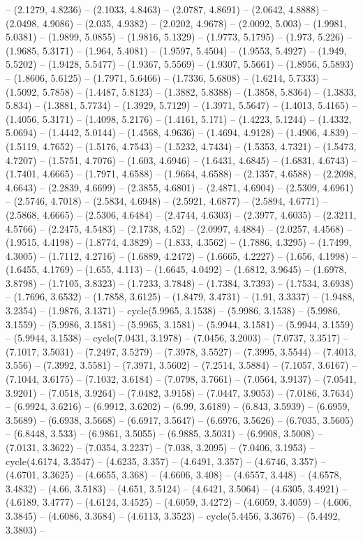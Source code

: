 -- (2.1279, 4.8236) -- (2.1033, 4.8463) -- (2.0787, 4.8691) -- (2.0642, 4.8888) -- (2.0498, 4.9086) -- (2.035, 4.9382) -- (2.0202, 4.9678) -- (2.0092, 5.003) -- (1.9981, 5.0381) -- (1.9899, 5.0855) -- (1.9816, 5.1329) -- (1.9773, 5.1795) -- (1.973, 5.226) -- (1.9685, 5.3171) -- (1.964, 5.4081) -- (1.9597, 5.4504) -- (1.9553, 5.4927) -- (1.949, 5.5202) -- (1.9428, 5.5477) -- (1.9367, 5.5569) -- (1.9307, 5.5661) -- (1.8956, 5.5893) -- (1.8606, 5.6125) -- (1.7971, 5.6466) -- (1.7336, 5.6808) -- (1.6214, 5.7333) -- (1.5092, 5.7858) -- (1.4487, 5.8123) -- (1.3882, 5.8388) -- (1.3858, 5.8364) -- (1.3833, 5.834) -- (1.3881, 5.7734) -- (1.3929, 5.7129) -- (1.3971, 5.5647) -- (1.4013, 5.4165) -- (1.4056, 5.3171) -- (1.4098, 5.2176) -- (1.4161, 5.171) -- (1.4223, 5.1244) -- (1.4332, 5.0694) -- (1.4442, 5.0144) -- (1.4568, 4.9636) -- (1.4694, 4.9128) -- (1.4906, 4.839) -- (1.5119, 4.7652) -- (1.5176, 4.7543) -- (1.5232, 4.7434) -- (1.5353, 4.7321) -- (1.5473, 4.7207) -- (1.5751, 4.7076) -- (1.603, 4.6946) -- (1.6431, 4.6845) -- (1.6831, 4.6743) -- (1.7401, 4.6665) -- (1.7971, 4.6588) -- (1.9664, 4.6588) -- (2.1357, 4.6588) -- (2.2098, 4.6643) -- (2.2839, 4.6699) -- (2.3855, 4.6801) -- (2.4871, 4.6904) -- (2.5309, 4.6961) -- (2.5746, 4.7018) -- (2.5834, 4.6948) -- (2.5921, 4.6877) -- (2.5894, 4.6771) -- (2.5868, 4.6665) -- (2.5306, 4.6484) -- (2.4744, 4.6303) -- (2.3977, 4.6035) -- (2.3211, 4.5766) -- (2.2475, 4.5483) -- (2.1738, 4.52) -- (2.0997, 4.4884) -- (2.0257, 4.4568) -- (1.9515, 4.4198) -- (1.8774, 4.3829) -- (1.833, 4.3562) -- (1.7886, 4.3295) -- (1.7499, 4.3005) -- (1.7112, 4.2716) -- (1.6889, 4.2472) -- (1.6665, 4.2227) -- (1.656, 4.1998) -- (1.6455, 4.1769) -- (1.655, 4.113) -- (1.6645, 4.0492) -- (1.6812, 3.9645) -- (1.6978, 3.8798) -- (1.7105, 3.8323) -- (1.7233, 3.7848) -- (1.7384, 3.7393) -- (1.7534, 3.6938) -- (1.7696, 3.6532) -- (1.7858, 3.6125) -- (1.8479, 3.4731) -- (1.91, 3.3337) -- (1.9488, 3.2354) -- (1.9876, 3.1371) -- cycle(5.9965, 3.1538) -- (5.9986, 3.1538) -- (5.9986, 3.1559) -- (5.9986, 3.1581) -- (5.9965, 3.1581) -- (5.9944, 3.1581) -- (5.9944, 3.1559) -- (5.9944, 3.1538) -- cycle(7.0431, 3.1978) -- (7.0456, 3.2003) -- (7.0737, 3.3517) -- (7.1017, 3.5031) -- (7.2497, 3.5279) -- (7.3978, 3.5527) -- (7.3995, 3.5544) -- (7.4013, 3.556) -- (7.3992, 3.5581) -- (7.3971, 3.5602) -- (7.2514, 3.5884) -- (7.1057, 3.6167) -- (7.1044, 3.6175) -- (7.1032, 3.6184) -- (7.0798, 3.7661) -- (7.0564, 3.9137) -- (7.0541, 3.9201) -- (7.0518, 3.9264) -- (7.0482, 3.9158) -- (7.0447, 3.9053) -- (7.0186, 3.7634) -- (6.9924, 3.6216) -- (6.9912, 3.6202) -- (6.99, 3.6189) -- (6.843, 3.5939) -- (6.6959, 3.5689) -- (6.6938, 3.5668) -- (6.6917, 3.5647) -- (6.6976, 3.5626) -- (6.7035, 3.5605) -- (6.8448, 3.533) -- (6.9861, 3.5055) -- (6.9885, 3.5031) -- (6.9908, 3.5008) -- (7.0131, 3.3622) -- (7.0354, 3.2237) -- (7.038, 3.2095) -- (7.0406, 3.1953) -- cycle(4.6174, 3.3547) -- (4.6235, 3.357) -- (4.6491, 3.357) -- (4.6746, 3.357) -- (4.6701, 3.3625) -- (4.6655, 3.368) -- (4.6606, 3.408) -- (4.6557, 3.448) -- (4.6578, 3.4832) -- (4.66, 3.5183) -- (4.651, 3.5124) -- (4.6421, 3.5064) -- (4.6305, 3.4921) -- (4.6189, 3.4777) -- (4.6124, 3.4525) -- (4.6059, 3.4272) -- (4.6059, 3.4059) -- (4.606, 3.3845) -- (4.6086, 3.3684) -- (4.6113, 3.3523) -- cycle(5.4456, 3.3676) -- (5.4492, 3.3803) -- 